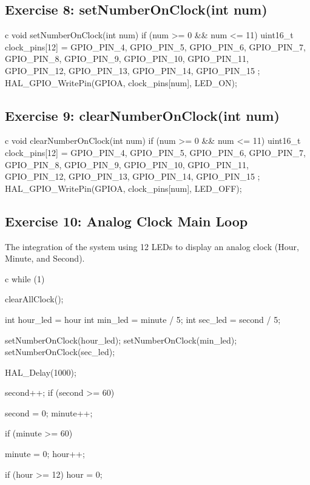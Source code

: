 \documentclass{hcmut-report}
\begin{document}
\subsection*{Exercise 8: setNumberOnClock(int num)}
\begin{code}{c}
void setNumberOnClock(int num) {
    if (num >= 0 && num <= 11) {
        uint16_t clock_pins[12] = {
            GPIO_PIN_4, GPIO_PIN_5, GPIO_PIN_6,  GPIO_PIN_7,
            GPIO_PIN_8, GPIO_PIN_9, GPIO_PIN_10, GPIO_PIN_11,
            GPIO_PIN_12, GPIO_PIN_13, GPIO_PIN_14, GPIO_PIN_15 
        };
        HAL_GPIO_WritePin(GPIOA, clock_pins[num], LED_ON);
    }
}
\end{code}

\subsection*{Exercise 9: clearNumberOnClock(int num)}
\begin{code}{c}
void clearNumberOnClock(int num) {
    if (num >= 0 && num <= 11) {
        uint16_t clock_pins[12] = {
            GPIO_PIN_4,  GPIO_PIN_5,  GPIO_PIN_6,  GPIO_PIN_7,
            GPIO_PIN_8,  GPIO_PIN_9,  GPIO_PIN_10, GPIO_PIN_11,
            GPIO_PIN_12, GPIO_PIN_13, GPIO_PIN_14, GPIO_PIN_15 
        };
        HAL_GPIO_WritePin(GPIOA, clock_pins[num], LED_OFF);
    }
}
\end{code}

\subsection*{Exercise 10: Analog Clock Main Loop}
The integration of the system using 12 LEDs to display an analog clock (Hour, Minute, and Second).
\begin{code}{c}
  while (1) {
      clearAllClock();

      int hour_led = hour %
      int min_led = minute / 5;
      int sec_led = second / 5;

      setNumberOnClock(hour_led);
      setNumberOnClock(min_led);
      setNumberOnClock(sec_led);

      HAL_Delay(1000);

      second++;
      if (second >= 60) {
          second = 0;
          minute++;

          if (minute >= 60) {
              minute = 0;
              hour++;

              if (hour >= 12) {
                  hour = 0;
              }
          }
      }
  }
\end{code}
\end{document}

